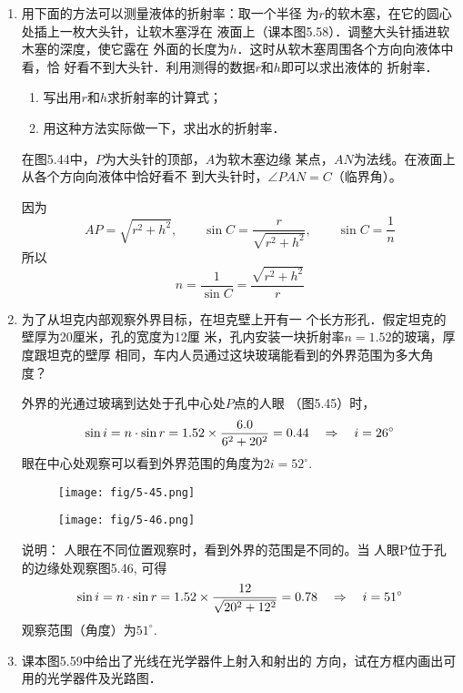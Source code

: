 \begin{enumerate}
\item 用下面的方法可以测量液体的折射率：取一个半径
为$r$的软木塞，在它的圆心处插上一枚大头针，让软木塞浮在
液面上（课本图5.58）．调整大头针插进软木塞的深度，使它露在
外面的长度为$h$．这时从软木塞周围各个方向向液体中看，恰
好看不到大头针．利用测得的数据$r$和$h$即可以求出液体的
折射率．
\begin{enumerate}
    \item 写出用$r$和$h$求折射率的计算式；
    \item 用这种方法实际做一下，求出水的折射率．
\end{enumerate}

\begin{solution}
    在图5.44中，$P$为大头针的顶部，$A$为软木塞边缘
某点，$AN$为法线。在液面上从各个方向向液体中恰好看不
到大头针时，$\angle PAN=C$（临界角）。

因为    
\[AP=\sqrt{r^2+h^2},\qquad \sin C=\frac{r}{\sqrt{r^2+h^2}},\qquad \sin C=\frac{1}{n}\]
所以
\[n=\frac{1}{\sin C}=\frac{\sqrt{r^2+h^2}}{r}\]
\end{solution}


\item 为了从坦克内部观察外界目标，在坦克壁上开有一
个长方形孔．假定坦克的壁厚为20厘米，孔的宽度为12厘
米，孔内安装一块折射率$n=1.52$的玻璃，厚度跟坦克的壁厚
相同，车内人员通过这块玻璃能看到的外界范围为多大角度？

\begin{solution}
    外界的光通过玻璃到达处于孔中心处$P$点的人眼
    （图5.45）时，
\[\sin i=n\cdot \sin r=1.52\times \frac{6.0}{6^2+20^2}=0.44\quad \Rightarrow\quad i=26^{\circ}\]
眼在中心处观察可以看到外界范围的角度为$2i=52^{\circ}$.
\begin{figure}[htp]\centering
    \begin{minipage}[t]{0.48\textwidth}
    \centering
\texttt{[image: fig/5-45.png]}
    \caption{}
    \end{minipage}
    \begin{minipage}[t]{0.48\textwidth}
    \centering
\texttt{[image: fig/5-46.png]}
    \caption{}
    \end{minipage}
    \end{figure}

说明：
人眼在不同位置观察时，看到外界的范围是不同的。当
人眼P位于孔的边缘处观察图5.46, 可得
\[\sin i=n\cdot \sin r =1.52\times \frac{12}{\sqrt{20^2+12^2}}=0.78\quad \Rightarrow\quad i=51^{\circ}\]
观察范围（角度）为$51^{\circ}$.

\end{solution}
\item 课本图5.59中给出了光线在光学器件上射入和射出的
方向，试在方框内画出可用的光学器件及光路图．


\end{enumerate}
